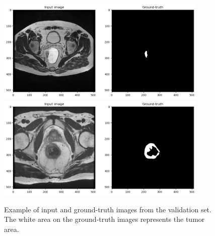 \documentclass{standalone}
\begin{document}
\begin{figure}[htp]

    \centering
    \includegraphics[width=0.9\textwidth]{../images/showdataset2.png}
    \includegraphics[width=0.9\textwidth]{../images/showdataset3.png}

    \caption{Example of input and ground-truth images from the validation set.
    The white area on the ground-truth images represents the tumor area.}
    \label{showdataset2}
    
    \end{figure}
\end{document}
